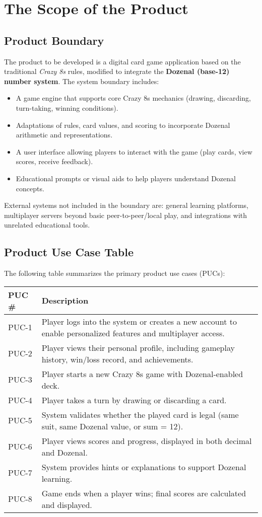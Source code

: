 \documentclass[12pt]{article}
\begin{document}
\section{The Scope of the Product}

\subsection{Product Boundary}
The product to be developed is a digital card game application based on the traditional \textit{Crazy 8s} rules, modified to integrate the \textbf{Dozenal (base-12) number system}.
The system boundary includes:
\begin{itemize}
    \item A game engine that supports core Crazy 8s mechanics (drawing, discarding, turn-taking, winning conditions).
    \item Adaptations of rules, card values, and scoring to incorporate Dozenal arithmetic and representations.
    \item A user interface allowing players to interact with the game (play cards, view scores, receive feedback).
    \item Educational prompts or visual aids to help players understand Dozenal concepts.
\end{itemize}
External systems not included in the boundary are: general learning platforms, multiplayer servers beyond basic peer-to-peer/local play, and integrations with unrelated educational tools.

\subsection{Product Use Case Table}
The following table summarizes the primary product use cases (PUCs):

\begin{tabularx}{\textwidth}{|l|X|}
    \hline
    \textbf{PUC \#} & \textbf{Description} \\
    \hline
    PUC-1 & Player logs into the system or creates a new account to enable personalized features and multiplayer access. \\
    \hline
    PUC-2 & Player views their personal profile, including gameplay history, win/loss record, and achievements. \\
    \hline
    PUC-3 & Player starts a new Crazy 8s game with Dozenal-enabled deck. \\
    \hline
    PUC-4 & Player takes a turn by drawing or discarding a card. \\
    \hline
    PUC-5 & System validates whether the played card is legal (same suit, same Dozenal value, or sum = 12). \\
    \hline
    PUC-6 & Player views scores and progress, displayed in both decimal and Dozenal. \\
    \hline
    PUC-7 & System provides hints or explanations to support Dozenal learning. \\
    \hline
    PUC-8 & Game ends when a player wins; final scores are calculated and displayed. \\
    \hline
\end{tabularx}
\end{document}
